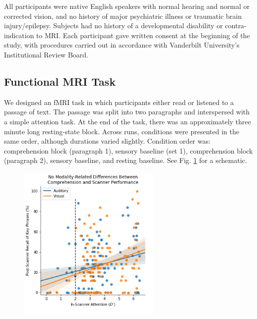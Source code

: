 All participants were native English speakers with normal hearing and normal or corrected vision, and no history of major psychiatric illness or traumatic brain injury/epilepsy. Subjects had no history of a developmental disability or contra-indication to MRI.  Each participant gave written consent at the beginning of the study, with procedures carried out in accordance with Vanderbilt University’s Institutional Review Board.

\begin{table}
	\renewcommand{\tabcolsep}{0.09cm}
	\centering
	
	\caption[Participant demographics for Study 1.]{}
	\label{table:ch2-participants}
\end{table}

\subsection{Functional MRI Task}

We designed an fMRI task in which participants either read or listened to a passage of text. The passage was split into two paragraphs and interspersed with a simple attention task. At the end of the task, there was an approximately three minute long resting-state block. Across runs, conditions were presented in the same order, although durations varied slightly. Condition order was: comprehension block (paragraph 1), sensory baseline (set 1), comprehension block (paragraph 2), sensory baseline, and resting baseline. See Fig. \ref{fig:ch2-task-design} for a schematic.

\begin{figure}[t]
	\centering
	\includegraphics[height=3in]{images/ch2-eprime-recall.png}
	\caption[Schematic of the reading comprehension task.]{}
	\label{fig:ch2-task-design}
\end{figure}


